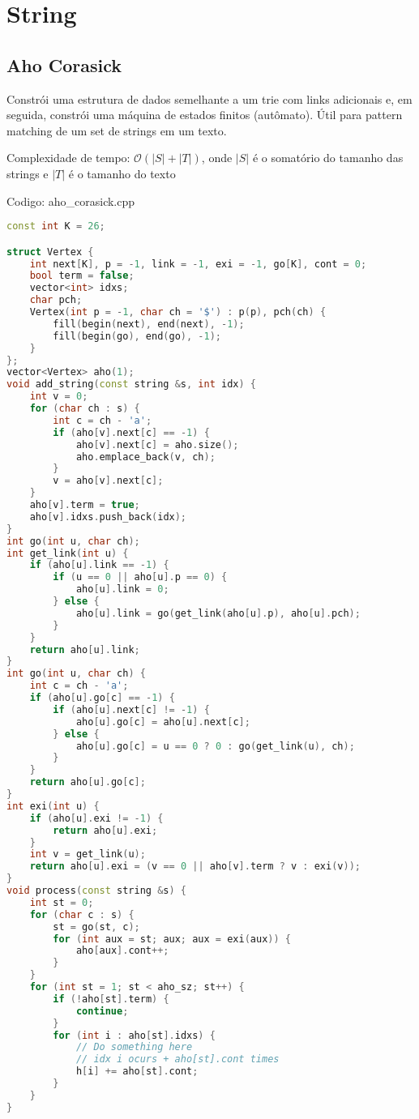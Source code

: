 \documentclass[10pt, a4paper, oneside]{book}
\begin{document}
%
%
%
%

\chapter{String}

\section{Aho Corasick}


Constrói uma estrutura de dados semelhante a um trie com links adicionais e, em seguida, constrói uma máquina de estados finitos (autômato). Útil para pattern matching de um set de strings em um texto.



Complexidade de tempo: $\mathcal{O}(|S|+|T|)$, onde $|S|$ é o somatório do tamanho das strings e $|T|$ é o tamanho do texto

\hfill

Codigo: aho\_corasick.cpp

\begin{lstlisting}[language=C++]
const int K = 26;

struct Vertex {
    int next[K], p = -1, link = -1, exi = -1, go[K], cont = 0;
    bool term = false;
    vector<int> idxs;
    char pch;
    Vertex(int p = -1, char ch = '$') : p(p), pch(ch) {
        fill(begin(next), end(next), -1);
        fill(begin(go), end(go), -1);
    }
};
vector<Vertex> aho(1);
void add_string(const string &s, int idx) {
    int v = 0;
    for (char ch : s) {
        int c = ch - 'a';
        if (aho[v].next[c] == -1) {
            aho[v].next[c] = aho.size();
            aho.emplace_back(v, ch);
        }
        v = aho[v].next[c];
    }
    aho[v].term = true;
    aho[v].idxs.push_back(idx);
}
int go(int u, char ch);
int get_link(int u) {
    if (aho[u].link == -1) {
        if (u == 0 || aho[u].p == 0) {
            aho[u].link = 0;
        } else {
            aho[u].link = go(get_link(aho[u].p), aho[u].pch);
        }
    }
    return aho[u].link;
}
int go(int u, char ch) {
    int c = ch - 'a';
    if (aho[u].go[c] == -1) {
        if (aho[u].next[c] != -1) {
            aho[u].go[c] = aho[u].next[c];
        } else {
            aho[u].go[c] = u == 0 ? 0 : go(get_link(u), ch);
        }
    }
    return aho[u].go[c];
}
int exi(int u) {
    if (aho[u].exi != -1) {
        return aho[u].exi;
    }
    int v = get_link(u);
    return aho[u].exi = (v == 0 || aho[v].term ? v : exi(v));
}
void process(const string &s) {
    int st = 0;
    for (char c : s) {
        st = go(st, c);
        for (int aux = st; aux; aux = exi(aux)) {
            aho[aux].cont++;
        }
    }
    for (int st = 1; st < aho_sz; st++) {
        if (!aho[st].term) {
            continue;
        }
        for (int i : aho[st].idxs) {
            // Do something here
            // idx i ocurs + aho[st].cont times
            h[i] += aho[st].cont;
        }
    }
}
\end{lstlisting}
\hfill
\end{document}
